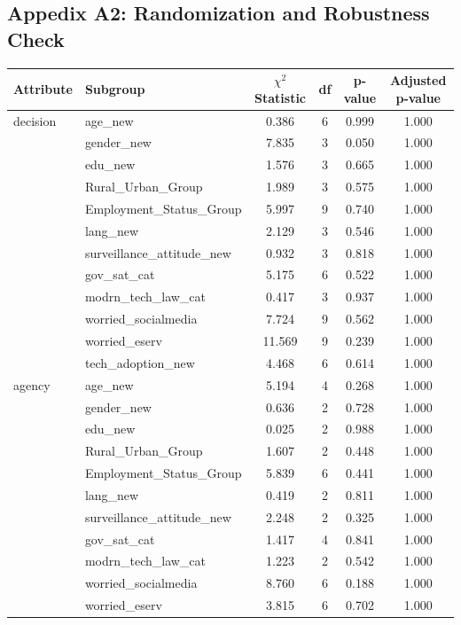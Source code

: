 \subsection*{Appedix A2: Randomization and Robustness Check}

\begin{table}[h]
\centering
\footnotesize
\begin{tabular}{@{}l l c c c c@{}}
\toprule
Attribute & Subgroup & $\chi^2$ Statistic & df & p-value & Adjusted p-value \\
\midrule
decision & age\_new & 0.386 & 6 & 0.999 & 1.000 \\
 & gender\_new & 7.835 & 3 & 0.050 & 1.000 \\
 & edu\_new & 1.576 & 3 & 0.665 & 1.000 \\
 & Rural\_Urban\_Group & 1.989 & 3 & 0.575 & 1.000 \\
 & Employment\_Status\_Group & 5.997 & 9 & 0.740 & 1.000 \\
 & lang\_new & 2.129 & 3 & 0.546 & 1.000 \\
 & surveillance\_attitude\_new & 0.932 & 3 & 0.818 & 1.000 \\
 & gov\_sat\_cat & 5.175 & 6 & 0.522 & 1.000 \\
 & modrn\_tech\_law\_cat & 0.417 & 3 & 0.937 & 1.000 \\
 & worried\_socialmedia & 7.724 & 9 & 0.562 & 1.000 \\
 & worried\_eserv & 11.569 & 9 & 0.239 & 1.000 \\
 & tech\_adoption\_new & 4.468 & 6 & 0.614 & 1.000 \\
\midrule
agency & age\_new & 5.194 & 4 & 0.268 & 1.000 \\
 & gender\_new & 0.636 & 2 & 0.728 & 1.000 \\
 & edu\_new & 0.025 & 2 & 0.988 & 1.000 \\
 & Rural\_Urban\_Group & 1.607 & 2 & 0.448 & 1.000 \\
 & Employment\_Status\_Group & 5.839 & 6 & 0.441 & 1.000 \\
 & lang\_new & 0.419 & 2 & 0.811 & 1.000 \\
 & surveillance\_attitude\_new & 2.248 & 2 & 0.325 & 1.000 \\
 & gov\_sat\_cat & 1.417 & 4 & 0.841 & 1.000 \\
 & modrn\_tech\_law\_cat & 1.223 & 2 & 0.542 & 1.000 \\
 & worried\_socialmedia & 8.760 & 6 & 0.188 & 1.000 \\
 & worried\_eserv & 3.815 & 6 & 0.702 & 1.000 \\

\end{tabular}
\end{table}
